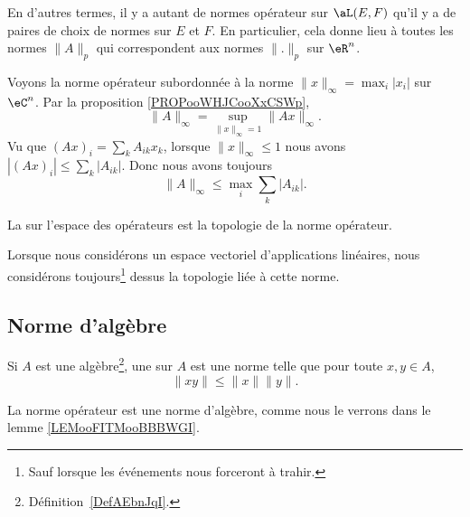 En d'autres termes, il y a autant de normes opérateur sur \( \aL(E,F)\) qu'il y a de paires de choix de normes sur \( E\) et \( F\). En particulier, cela donne lieu à toutes les normes \( \| A \|_p\) qui correspondent aux normes \( \| . \|_p\) sur \( \eR^n\).

\begin{example}     \label{EXooXPXAooYyBwMX}
	Voyons la norme opérateur subordonnée à la norme \( \| x \|_{\infty}=\max_i| x_i |\) sur \( \eC^n\). Par la proposition \ref{PROPooWHJCooXxCSWp},
	\begin{equation}
		\| A \|_{\infty}=\sup_{\| x \|_{\infty}=1}\| Ax \|_{\infty}.
	\end{equation}
	Vu que \( (Ax)_i=\sum_kA_{ik}x_k\), lorsque \( \| x \|_{\infty}\leq 1\) nous avons \( | (Ax)_i |\leq \sum_k| A_{ik} |\). Donc nous avons toujours
	\begin{equation}        \label{EQooPLCIooVghasD}
		\| A \|_{\infty}\leq \max_i\sum_{k}| A_{ik} |.
	\end{equation}
\end{example}

\begin{definition}
	La  sur l'espace des opérateurs est la topologie de la norme opérateur.
\end{definition}
Lorsque nous considérons un espace vectoriel d'applications linéaires, nous considérons toujours\footnote{Sauf lorsque les événements nous forceront à trahir.} dessus la topologie liée à cette norme.

\subsection{Norme d'algèbre}

\begin{definition}  \label{DefJWRWQue}
	Si \( A\) est une algèbre\footnote{Définition~\ref{DefAEbnJqI}.}, une  sur \( A\) est une norme telle que pour toute \( x,y\in A\),
	\begin{equation}
		\| xy \|\leq \| x \|\| y \|.
	\end{equation}
\end{definition}
La norme opérateur est une norme d'algèbre, comme nous le verrons dans le lemme \ref{LEMooFITMooBBBWGI}.

